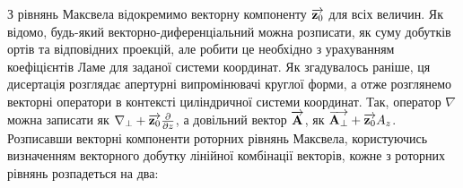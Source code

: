 

З рівнянь Максвела відокремимо векторну компоненту $ \overrightarrow{\mathbf z_0} $ для всіх 
величин. Як відомо, будь-який векторно-диференціальний можна 
розписати, як суму добутків ортів та відповідних проекцій, але робити це 
необхідно з урахуванням коефіцієнтів Ламе \cite{imp:Korn1974} для заданої 
системи координат. Як згадувалось раніше, ця дисертація розглядає апертурні 
випромінювачі круглої форми, а отже розглянемо векторні оператори в контексті 
циліндричної системи координат. Так, оператор $ \nabla $ можна записати як 
$ \nabla_\perp + \overrightarrow{\mathbf z_0} \frac{\partial }{\partial z} $, а довільний вектор
$ \overrightarrow{\mathbf A} $, як $ \overrightarrow{\mathbf A_\perp} + \overrightarrow{\mathbf z_0} A_z $. Розписавши векторні 
компоненти роторних рівнянь Максвела, користуючись визначенням векторного 
добутку лінійної комбінації векторів, кожне з роторних рівнянь розпадеться 
на два:

